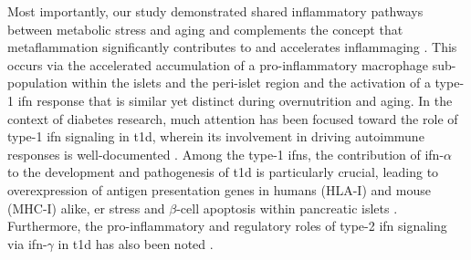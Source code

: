 \par Most importantly, our study demonstrated shared inflammatory pathways between metabolic stress and aging and complements the concept that metaflammation significantly contributes to and accelerates inflammaging \textbf{\cite{franceschi_continuum_2018}}. This occurs via the accelerated accumulation of a pro-inflammatory macrophage sub-population within the islets and the peri-islet region and the activation of a type-1 \acrfull{ifn} response that is similar yet distinct during overnutrition and aging. In the context of diabetes research, much attention has been focused toward the role of type-1 \gls{ifn} signaling in \gls{t1d}, wherein its involvement in driving autoimmune responses is well-documented \textbf{\cite{marroqui_type_2021,newby_type_2017}}. Among the type-1 \glspl{ifn}, the contribution of \gls{ifn}-$\alpha$ to the development and pathogenesis of \gls{t1d} is particularly crucial, leading to overexpression of antigen presentation genes in humans (HLA-I) and mouse (MHC-I) alike, \gls{er} stress and $\beta$-cell apoptosis within pancreatic islets \textbf{\cite{marroqui_interferon-_2017,marro_progression_2017,lombardi_interferon_2018,colli_integrated_2020,jiang_interferon-_2022,coomans_de_brachene_interferons_2024}}. Furthermore, the pro-inflammatory and regulatory roles of type-2 \gls{ifn} signaling via \gls{ifn}-$\gamma$ in \gls{t1d} has also been noted \textbf{\cite{coomans_de_brachene_interferons_2024,de_george_inflammation_2023}}.\\
